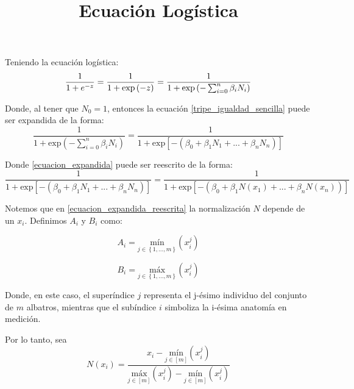 \documentclass{article}
\begin{document}
\title{Ecuación Logística}

\maketitle

Teniendo la ecuación logística:
\begin{equation}
    \label{tripe_igualdad_sencilla}
    \frac{1}{1+e^{-z}} = \frac{1}{1+\mbox{\mbox{exp}}\left ( -z\right )} = \frac{1}{1+\mbox{\mbox{exp}}\left (-\sum_{i=0}^{n} \beta _{i}N_{i} \right )}
\end{equation}

Donde, al tener que $N_{0}=1$, entonces la ecuación \ref{tripe_igualdad_sencilla} puede ser expandida de la forma:
\begin{equation}
    \label{ecuacion_expandida}
    \frac{1}{1+\mbox{exp}\left (-\sum_{i=0}^{n} \beta _{i}N_{i} \right )} = \frac{1}{1+\mbox{exp}\left [ -\left ( \beta _{0} + \beta _{1}N_{1}+...+\beta_{n}N_{n} \right ) \right ]}
\end{equation}

Donde \ref{ecuacion_expandida} puede ser reescrito de la forma:
\begin{equation}
    \label{ecuacion_expandida_reescrita}    
    \frac{1}{1+\mbox{exp}\left [ -\left ( \beta _{0} + \beta _{1}N_{1}+...+\beta_{n}N_{n} \right ) \right ]} = \frac{1}{1+\mbox{exp}\left [ -\left ( \beta _{0} + \beta _{1}N(x_{1})+...+\beta_{n}N(x_{n})\right ) \right ]}
\end{equation}

Notemos que en \ref{ecuacion_expandida_reescrita} la normalización $N$ depende de un $x_{i}$. Definimos $A_{i}$ y $B_{i}$ como:

\begin{equation}
    \label{maximos_A}
    A_{i}= \underset{j\in \left \{ 1,...,m \right \}}{\mbox{mín}}\left ( x_{i}^{j} \right )
\end{equation}

\begin{equation}
    \label{minimos_B}
    B_{i}= \underset{j\in \left \{ 1,...,m \right \}}{\mbox{máx}}\left ( x_{i}^{j} \right )
\end{equation}

Donde, en este caso, el superíndice $j$ representa el j-ésimo individuo del conjunto de $m$ albatros, mientras que el subíndice $i$ simboliza la i-ésima anatomía en medición.

Por lo tanto, sea 
\begin{equation} \label{normalizacion} N\left ( x_{i} \right )= \frac{x_{i} - \underset{j\in [m ]}{\mbox{mín}}\left (  x_{i}^{j}\right )}{\underset{j\in [m ]}{\mbox{máx}}\left (  x_{i}^{j}\right )-\underset{j\in [m ]}{\mbox{mín}}\left (  x_{i}^{j}\right )}
\end{equation}
\end{document}
